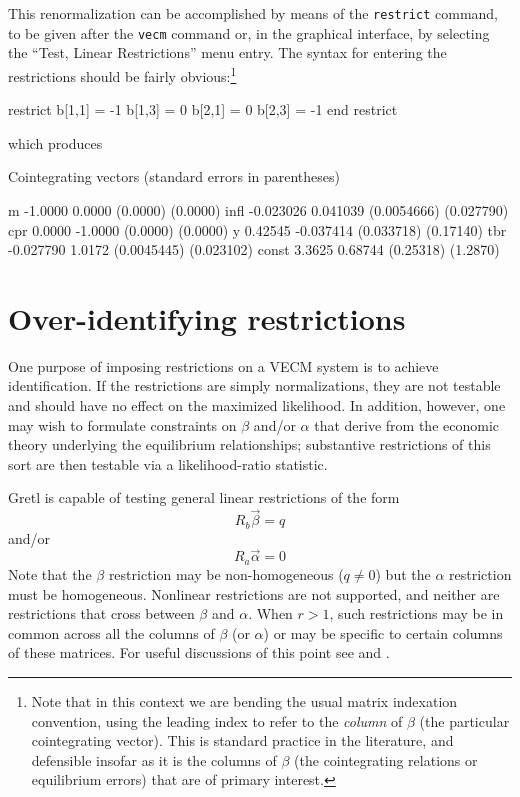 This renormalization can be accomplished by means of the
\texttt{restrict} command, to be given after the \texttt{vecm} command
or, in the graphical interface, by selecting the ``Test, Linear
Restrictions'' menu entry. The syntax for entering the restrictions
should be fairly obvious:\footnote{Note that in this context we are
  bending the usual matrix indexation convention, using the leading
  index to refer to the \textit{column} of $\beta$ (the particular
  cointegrating vector).  This is standard practice in the literature,
  and defensible insofar as it is the columns of $\beta$ (the
  cointegrating relations or equilibrium errors) that are of primary
  interest.}
\begin{code}
restrict
  b[1,1] = -1
  b[1,3] = 0
  b[2,1] = 0
  b[2,3] = -1
end restrict
\end{code}
which produces

\begin{code}
Cointegrating vectors (standard errors in parentheses)

m          -1.0000       0.0000 
           (0.0000)     (0.0000) 
infl     -0.023026     0.041039 
        (0.0054666)   (0.027790) 
cpr         0.0000      -1.0000 
           (0.0000)     (0.0000) 
y          0.42545    -0.037414 
         (0.033718)    (0.17140) 
tbr      -0.027790       1.0172 
        (0.0045445)   (0.023102) 
const       3.3625      0.68744 
          (0.25318)     (1.2870) 
\end{code}

\section{Over-identifying restrictions}
\label{sec:johansen-overid}

One purpose of imposing restrictions on a VECM system is to achieve
identification.  If the restrictions are simply normalizations, they
are not testable and should have no effect on the maximized
likelihood.  In addition, however, one may wish to formulate
constraints on $\beta$ and/or $\alpha$ that derive from the economic
theory underlying the equilibrium relationships; substantive
restrictions of this sort are then testable via a likelihood-ratio
statistic.

Gretl is capable of testing general linear restrictions of the form
\begin{equation}
\label{eq:Rb}
R_b \vec{\beta} = q
\end{equation}
and/or
\begin{equation}
\label{eq:Ra}
R_a \vec{\alpha} = 0
\end{equation}
%
Note that the $\beta$ restriction may be non-homogeneous ($q \neq 0$)
but the $\alpha$ restriction must be homogeneous.  Nonlinear
restrictions are not supported, and neither are restrictions that
cross between $\beta$ and $\alpha$.  When $r > 1$, such restrictions
may be in common across all the columns of $\beta$ (or $\alpha$) or
may be specific to certain columns of these matrices. For useful
discussions of this point see \cite{boswijk95} and
\cite[section 4.4]{boswijk-doornik04}.

